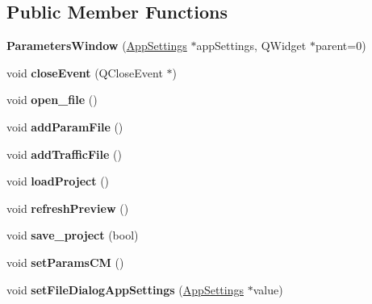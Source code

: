 \subsection*{Public Member Functions}
\begin{DoxyCompactItemize}
\item 
{\bfseries Parameters\+Window} (\hyperlink{class_app_settings}{App\+Settings} $\ast$app\+Settings, Q\+Widget $\ast$parent=0)\hypertarget{class_parameters_window_aabc90d5c8e7d07f6cd801d0fcef23acc}{}\label{class_parameters_window_aabc90d5c8e7d07f6cd801d0fcef23acc}

\item 
void {\bfseries close\+Event} (Q\+Close\+Event $\ast$)\hypertarget{class_parameters_window_ade95eb80ad934731c508f8af9772da23}{}\label{class_parameters_window_ade95eb80ad934731c508f8af9772da23}

\item 
void {\bfseries open\+\_\+file} ()\hypertarget{class_parameters_window_a12a234dc7dcab35ca42133a2d2720075}{}\label{class_parameters_window_a12a234dc7dcab35ca42133a2d2720075}

\item 
void {\bfseries add\+Param\+File} ()\hypertarget{class_parameters_window_a57e7b50f8d2d5d8157c7708096df2990}{}\label{class_parameters_window_a57e7b50f8d2d5d8157c7708096df2990}

\item 
void {\bfseries add\+Traffic\+File} ()\hypertarget{class_parameters_window_a3bb083f996c74771bfb2e80564ac67e1}{}\label{class_parameters_window_a3bb083f996c74771bfb2e80564ac67e1}

\item 
void {\bfseries load\+Project} ()\hypertarget{class_parameters_window_aeefbd834074c8e4002d9e3180cb1b88c}{}\label{class_parameters_window_aeefbd834074c8e4002d9e3180cb1b88c}

\item 
void {\bfseries refresh\+Preview} ()\hypertarget{class_parameters_window_a0c53eaac00e920ffe54c1cf053590a89}{}\label{class_parameters_window_a0c53eaac00e920ffe54c1cf053590a89}

\item 
void {\bfseries save\+\_\+project} (bool)\hypertarget{class_parameters_window_ac77e387c68cbc06a076b257691e58caf}{}\label{class_parameters_window_ac77e387c68cbc06a076b257691e58caf}

\item 
void {\bfseries set\+Params\+CM} ()\hypertarget{class_parameters_window_a335f92ac1273050e3716d72f774c2a47}{}\label{class_parameters_window_a335f92ac1273050e3716d72f774c2a47}

\item 
void {\bfseries set\+File\+Dialog\+App\+Settings} (\hyperlink{class_app_settings}{App\+Settings} $\ast$value)\hypertarget{class_parameters_window_a2d29e9aeef763b22a65b128c9b4bf7d1}{}\label{class_parameters_window_a2d29e9aeef763b22a65b128c9b4bf7d1}

\end{DoxyCompactItemize}


